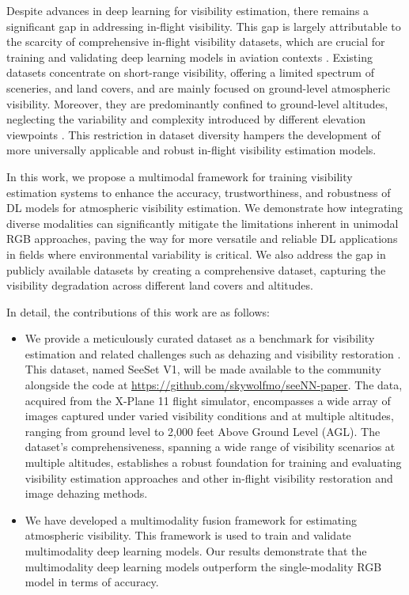 Despite advances in deep learning for visibility estimation, there remains a significant gap in addressing in-flight visibility. This gap is largely attributable to the scarcity of comprehensive in-flight visibility datasets, which are crucial for training and validating deep learning models in aviation contexts \cite{AitOuadil2023}. Existing datasets concentrate on short-range visibility, offering a limited spectrum of sceneries, and land covers, and are mainly focused on ground-level atmospheric visibility. Moreover, they are predominantly confined to ground-level altitudes, neglecting the variability and complexity introduced by different elevation viewpoints \cite{AitOuadil2023}. This restriction in dataset diversity hampers the development of more universally applicable and robust in-flight visibility estimation models.

In this work, we propose a multimodal framework for training visibility estimation systems to enhance the accuracy, trustworthiness, and robustness of DL models for atmospheric visibility estimation. We demonstrate how integrating diverse modalities can significantly mitigate the limitations inherent in unimodal RGB approaches, paving the way for more versatile and reliable DL applications in fields where environmental variability is critical. We also address the gap in publicly available datasets by creating a comprehensive dataset, capturing the visibility degradation across different land covers and altitudes.



In detail, the contributions of this work are as follows:
\begin{itemize}
    \item We provide a meticulously curated dataset as a benchmark for visibility estimation and related challenges such as dehazing and visibility restoration \cite{gui2023comprehensive}. This dataset, named SeeSet V1, will be made available to the community alongside the code at \url{https://github.com/skywolfmo/seeNN-paper}. The data, acquired from the X-Plane 11 flight simulator, encompasses a wide array of images captured under varied visibility conditions and at multiple altitudes, ranging from ground level to 2,000 feet Above Ground Level (AGL).  
    The dataset's comprehensiveness, spanning a wide range of visibility scenarios at multiple altitudes, establishes a robust foundation for training and evaluating visibility estimation approaches and other in-flight visibility restoration and image dehazing methods.
    
    \item  We have developed a multimodality fusion framework for estimating atmospheric visibility. This framework is used to train and validate multimodality deep learning models. Our results demonstrate that the multimodality deep learning models outperform the single-modality RGB model in terms of accuracy.


\end{itemize}

